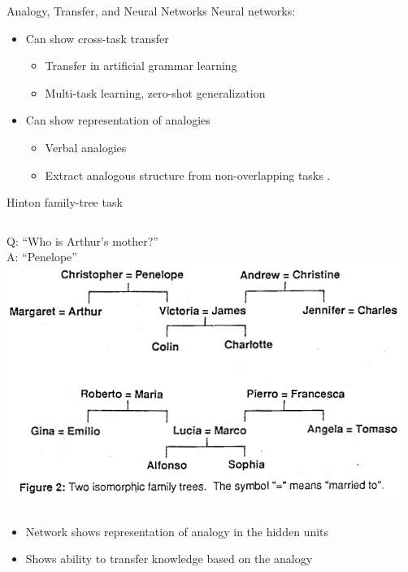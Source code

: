 \documentclass{beamer}
\begin{document}
\begin{frame}{Analogy, Transfer, and Neural Networks}
Neural networks:
\begin{itemize}[<+->]
    \item Can show cross-task transfer
    \begin{itemize}
	\item Transfer in artificial grammar learning \cite{Dienes1999}
	\item Multi-task learning, zero-shot generalization \cite{Luong2016,Johnson2016}  
    \end{itemize}
    \item Can show representation of analogies
    \begin{itemize}
	\item Verbal analogies \cite{Kollias2013}
	\item Extract analogous structure from non-overlapping tasks \cite{Hinton1986}.
    \end{itemize}
\end{itemize}
\end{frame}

\begin{frame}{Hinton family-tree task}
\begin{columns}
 Q: ``Who is Arthur's mother?'' \\ A: ``Penelope'' %
    \includegraphics[width = \textwidth]{../writing/cogsci_2017/figures/hinton_family_tree_figure.png}
\end{columns}
\begin{itemize}
\item <2-> Network shows representation of analogy in the hidden units
\item <3-> Shows ability to transfer knowledge based on the analogy
\end{itemize}
\end{frame}
\end{document}
